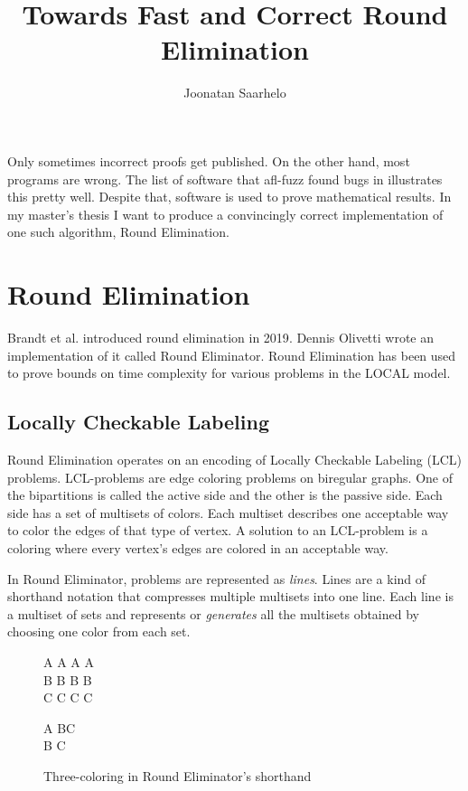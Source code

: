 \documentclass{article}
\title{Towards Fast and Correct Round Elimination}
\author{Joonatan Saarhelo}
\begin{document}
\maketitle

Only sometimes incorrect proofs get published. On the other hand, most programs are wrong. The list of software that afl-fuzz\cite{AFL} found bugs in illustrates this pretty well. Despite that, software is used to prove mathematical results. In my master's thesis I want to produce a convincingly correct implementation of one such algorithm, Round Elimination.

\section{Round Elimination}

Brandt et al. introduced round elimination in 2019\cite{speedup}. Dennis Olivetti wrote an implementation of it called Round Eliminator\cite{RE}. Round Elimination has been used to prove bounds on time complexity for various problems in the LOCAL model.\cite{tc1, tc2, tc3}

\subsection{Locally Checkable Labeling}

Round Elimination operates on an encoding of Locally Checkable Labeling (LCL) problems. LCL-problems are edge coloring problems on biregular graphs. One of the bipartitions is called the active side and the other is the passive side. Each side has a set of multisets of colors. Each multiset describes one acceptable way to color the edges of that type of vertex. A solution to an LCL-problem is a coloring where every vertex's edges are colored in an acceptable way.

In Round Eliminator, problems are represented as \emph{lines}. Lines are a kind of shorthand notation that compresses multiple multisets into one line. Each line is a multiset of sets and represents or \emph{generates} all the multisets obtained by choosing one color from each set.\cite{RE}

\begin{figure}[h]
\centering
\begin{tcolorbox}[width=.2\textwidth, nobeforeafter, title=active side]
A A A A \\
B B B B \\
C C C C
\end{tcolorbox}
\begin{tcolorbox}[width=.2\textwidth, nobeforeafter, title=passive side]
A BC \\
B C
\end{tcolorbox}
\caption{Three-coloring in Round Eliminator's shorthand}
\end{figure}
\end{document}

